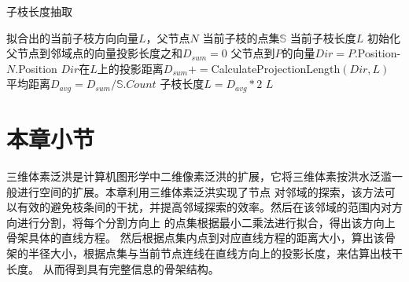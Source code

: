 \begin{algorithm}[H]
	\caption{子枝长度抽取}
	\label{alg:length}
	\begin{algorithmic}[1] 
		\Require 拟合出的当前子枝方向向量$L$，父节点$N$
		\Require 当前子枝的点集$\mathbb{S}$
		\Ensure 当前子枝长度$L$
		\State 初始化父节点到邻域点的向量投影长度之和$D_{sum}=0$
		\State 父节点到$P$的向量$Dir=P$.Position-$N$.Position
		\State $Dir$在$L$上的投影距离$D_{sum}+=$CalculateProjectionLength$(Dir, L)$
		\EndFor
		\State 平均距离$D_{avg}=D_{sum}/\mathbb{S}.Count$
		\State 子枝长度$L=D_{avg}*2$
		\State \Return $L$
	\end{algorithmic}
\end{algorithm}

\section{本章小节}

三维体素泛洪是计算机图形学中二维像素泛洪的扩展，它将三维体素按洪水泛滥一般进行空间的扩展。本章利用三维体素泛洪实现了节点
对邻域的探索，该方法可以有效的避免枝条间的干扰，并提高邻域探索的效率。然后在该邻域的范围内对方向进行分割，将每个分割方向上
的点集根据最小二乘法进行拟合，得出该方向上骨架具体的直线方程。
然后根据点集内点到对应直线方程的距离大小，算出该骨架的半径大小，根据点集与当前节点连线在直线方向上的投影长度，来估算出枝干长度。
从而得到具有完整信息的骨架结构。
